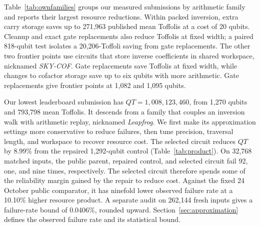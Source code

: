 \documentclass[aps,prx,reprint,raggedbottom,superscriptaddress,longbibliography,floatfix]{revtex4-2}
\begin{document}
\begin{table}[!tp]
\caption{\textbf{Resource reductions across the three families we modify.}
Rows order the largest Toffoli reductions from high to low.
Each saving compares a submitted circuit with its declared parent; Leapfrog uses our repaired control.
T differences use recorded rounded means on separate evaluation inputs.
The two maxima can describe different circuits.
The largest Froghop T saving adds 20 qubits; its largest Q saving adds 1,811,710 Toffolis.
The largest SKY-COF Q saving adds 85,793 Toffolis.
The Leapfrog circuit saves both 22 qubits and 63,584 Toffolis from the repaired control.
Commits / curve gives measured commits and their points on the frozen frontier.
All 52 submissions have published resource counts.}
\label{tab:ownfamilies}
\centering\small

\end{table}

Table~\ref{tab:ownfamilies} groups our measured submissions by arithmetic family and reports their largest resource reductions.
Within packed inversion, extra carry storage saves up to 271,963 published mean Toffolis at a cost of 20 qubits.
Cleanup and exact gate replacements also reduce Toffolis at fixed width; a paired 818-qubit test isolates a 20,206-Toffoli saving from gate replacements.
The other two frontier points use circuits that store inverse coefficients in shared workspace, nicknamed \emph{SKY-COF}.
Gate replacements save Toffolis at fixed width, while changes to cofactor storage save up to six qubits with more arithmetic.
Gate replacements give frontier points at 1,082 and 1,095 qubits.

Our lowest leaderboard submission has $QT=1{,}008{,}123{,}460$, from 1,270 qubits and 793,798 mean Toffolis.
It descends from a family that couples an inversion walk with arithmetic replay, nicknamed \emph{Leapfrog}.
We first make its approximation settings more conservative to reduce failures, then tune precision, traversal length, and workspace to recover resource cost.
The selected circuit reduces $QT$ by 8.99\% from the repaired 1,292-qubit control (Table~\ref{tab:product}).
On 32,768 matched inputs, the public parent, repaired control, and selected circuit fail 92, one, and nine times, respectively.
The selected circuit therefore spends some of the reliability margin gained by the repair to reduce cost.
Against the fixed 24 October public comparator, it has ninefold lower observed failure rate at a 10.10\% higher resource product.
A separate audit on 262,144 fresh inputs gives a failure-rate bound of 0.0406\%, rounded upward.
Section~\ref{sec:approximation} defines the observed failure rate and its statistical bound.
\end{document}
